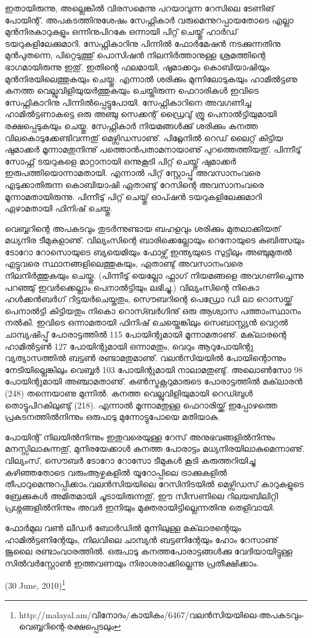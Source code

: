 ഇതായിരുന്നു, അല്ലെങ്കില്‍ വിരസമെന്നു പറയാവുന്ന റേസിലെ ടേണിങ് പോയിന്റ്. അപകടത്തിനുശേഷം സേഫ്റ്റികാര്‍ 
വരുമെന്നുറപ്പായതോടെ എല്ലാ മുന്‍നിരകാറുകളും ഒന്നിനുപിറകേ ഒന്നായി പിറ്റ് ചെയ്തു് ഹാര്‍ഡ് ടയറുകളിലേക്കുമാറി. 
സേഫ്റ്റികാറിനു പിന്നില്‍ ഫോര്‍മേഷന്‍ നടക്കുന്നതിനു മുന്‍പുതന്നെ, പിറ്റെടുത്തു് പൊസിഷന്‍ നിലനിര്‍ത്താനുള്ള 
ശ്രമത്തിന്റെ ഭാഗമായിരുന്നു ഇതു്. ഇതിന്റെ ഫലമായി, ഷുമാക്കറും കൊബിയാഷിയും മുന്‍നിരയിലെത്തുകയും ചെയ്തു. 
എന്നാല്‍ ശരിക്കും മുന്നിലോടുകയും ഹാമില്‍ട്ടണു കനത്ത വെല്ലുവിളിയുയര്‍ത്തുകയും ചെയ്തിരുന്ന ഫെറാരികള്‍ ഇവിടെ 
സേഫ്റ്റികാറിനു പിന്നില്‍പ്പെട്ടുപോയി. സേഫ്റ്റികാറിനെ അവഗണിച്ച ഹാമില്‍ട്ടണാകട്ടെ ഒരു അഞ്ചു സെക്കന്റ് ഡ്രൈവു് ത്രൂ 
പെനാല്‍ട്ടിയുമായി രക്ഷപ്പെടുകയും ചെയ്തു. സേഫ്റ്റികാര്‍ നിയമങ്ങള്‍ക്കു് ശരിക്കും കനത്ത വിലകൊടുക്കേണ്ടിവന്നതു് 
മെഴ്സിഡസാണു്. പിറ്റ്ലേനില്‍ റെഡ് ലൈറ്റ് കിട്ടിയ ഷുമാക്കര്‍ മൂന്നാമതുനിന്നു് പത്തൊന്‍പതാമനായാണു് പുറത്തെത്തിയതു്. 
പിന്നീടു് സോഫ്റ്റ് ടയറുകളെ മാറ്റാനായി ഒന്നുകൂടി പിറ്റ് ചെയ്തു് ഷുമാക്കര്‍ ഇരുപത്തിയൊന്നാമതായി. എന്നാല്‍ പിറ്റ് 
സ്റ്റോപ്പു് അവസാനംവരെ എടുക്കാതിരുന്ന കൊബിയാഷി ഏതാണ്ടു് റേസിന്റെ അവസാനംവരെ മൂന്നാമതായിരുന്നു. 
പിന്നീടു് പിറ്റ് ചെയ്തു് ഓപ്ഷന്‍ ടയറുകളിലേക്കുമാറി ഏഴാമതായി ഫിനിഷ് ചെയ്തു.

വെബ്ബറിന്റെ അപകടവും തുടര്‍ന്നുണ്ടായ ബഹളവും ശരിക്കും മുതലാക്കിയത് മധ്യനിര ടീമുകളാണു്. വില്യംസിന്റെ 
ബാരിക്കെല്ലോയും റെനോയുടെ കുബിത്സയും ടോറോ റോസൊയുടെ ബ്യയെമിയും ഫോഴ്സ് ഇന്ത്യയുടെ സുട്ടിലും 
അഞ്ചുമുതല്‍ എട്ടുവരെ സ്ഥാനങ്ങളിലെത്തുകയും, ഏതാണ്ടു് അവസാനംവരെ നിലനിര്‍ത്തുകയും ചെയ്തു. (പിന്നീടു് 
യെല്ലോ ഫ്ലാഗ് നിയമങ്ങളെ അവഗണിച്ചെന്നു പറഞ്ഞു് ഇവര്‍ക്കെല്ലാം പെനാല്‍ട്ടിയും ലഭിച്ചു.) വില്യംസിന്റെ നികൊ 
ഹള്‍ക്കന്‍ബര്‍ഗ് റിട്ടയര്‍ചെയ്തതും, സൌബറിന്റെ പെഡ്രോ ഡി ലാ റൊസയ്ക്കു് പെനാല്‍ട്ടി കിട്ടിയതും നികൊ 
റൊസ്ബര്‍ഗിനു് ഒരു ആശ്വാസ പത്താംസ്ഥാനം നല്‍കി. ഇവിടെ ഒന്നാമതായി ഫിനിഷ് ചെയ്തെങ്കിലും സെബാസ്റ്റ്യന്‍ 
വെറ്റല്‍ ചാമ്പ്യഷിപ്പു് പോരാട്ടത്തില്‍ 115 പോയിന്റുമായി മൂന്നാമതാണു്. മക്‌ലാരന്റെ ഹാമില്‍ട്ടണ്‍ 127 പോയിന്റുമായി 
ഒന്നാമതും, വെറും ആറുപോയിന്റു വ്യത്യാസത്തില്‍ ബട്ടണ്‍ രണ്ടാമതുമാണു്. വലന്‍സിയയില്‍ പോയിന്റൊന്നും 
നേടിയില്ലെങ്കിലും വെബ്ബര്‍ 103 പോയിന്റുമായി നാലാമതുണ്ടു്. അലൊണ്‍സോ 98 പോയിന്റുമായി അഞ്ചാമതാണു്. 
കണ്‍സ്ട്രക്റ്ററുമാരുടെ പോരാട്ടത്തില്‍ മക്‌ലാരന്‍ (248) തന്നെയാണു മുന്നില്‍. കനത്ത വെല്ലുവിളിയുമായി റെഡ്ബുള്‍ 
തൊട്ടുപിറകിലുണ്ടു് (218). എന്നാല്‍ മൂന്നാമതുള്ള ഫെറാരിയ്ക്ക് ഇപ്പോഴത്തെ പ്രകടനത്തില്‍നിന്നും 
ഒരുപാടു മുന്നോട്ടുപോയെ മതിയാകു.

പോയിന്റ് നിലയില്‍നിന്നും ഇതുവരെയുള്ള റേസ് അനുഭവങ്ങളില്‍നിന്നും മനസ്സിലാകുന്നതു്, മുനിരയേക്കാള്‍ കനത്ത 
പോരാട്ടം മധ്യനിരയിലാകുമെന്നാണു്. വില്യംസ്, സൌബര്‍ ടോറോ റോസോ ടീമുകള്‍ കൂടി കരുത്തറിയിച്ചു കഴിഞ്ഞതോടെ
വരുംആഴ്ചകളില്‍ യൂറോപ്പിലെ ട്രാക്കുകളില്‍ തീപാറുമെന്നുറപ്പിക്കാം.വലന്‍സിയയിലെ റേസിനിടയില്‍ മെഴ്സിഡസ് 
കാറുകളുടെ ബ്രേക്കുകള്‍ അമിതമായി ചൂടായിരുന്നതു്, ഈ സീസണിലെ റിലയബിലിറ്റി പ്രശ്നങ്ങളില്‍നിന്നും അവര്‍ ഇനിയും 
മുക്തരായിട്ടില്ലെന്നതിനു തെളിവായി.

ഫോര്‍മുല വണ്‍ ലീഡര്‍ ബോര്‍ഡില്‍ മുന്നിലുള്ള മക്‌ലാരന്റെയും ഹാമില്‍ട്ടണിന്റേയും, നിലവിലെ ചാമ്പ്യന്‍ ബട്ടണിന്റേയും
ഹോം റേസാണു് ജൂലൈ രണ്ടാംവാരത്തില്‍. ഒരുപാടു കനത്തപോരാട്ടങ്ങള്‍ക്കു വേദിയായിട്ടുള്ള സില്‍വര്‍സ്റ്റോണ്‍ 
ഇത്തവണയും നിരാശരാക്കില്ലെന്നു പ്രതീക്ഷിക്കാം.

\hspace*{2em}(30 June, 2010)\footnote{http://malayal.am/വിനോദം/കായികം/6467/വലന്‍സിയയിലെ-അപകടവും-വെബ്ബറിന്റെ-രക്ഷപ്പെടലും}

\newpage

